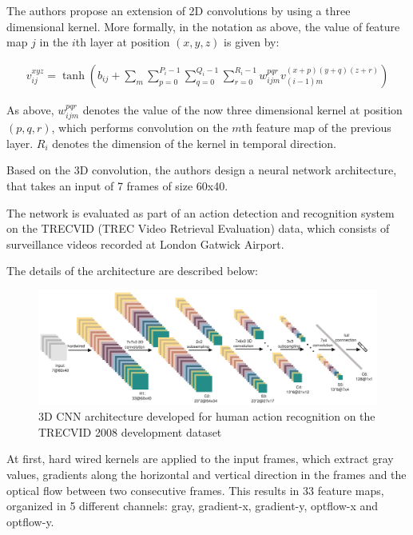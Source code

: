 The authors propose an extension of 2D convolutions by using a three dimensional kernel. More formally, in the notation as above, the value of feature map $j$ in the $i$th layer at position $(x,y,z)$ is given by:

\begin{align*}
    v_{ij}^{xyz} = \tanh \left( b_{ij} + \sum_m \sum_{p=0}^{P_i -1} \sum_{q = 0}^{Q_i - 1} \sum_{r = 0}^{R_i - 1} w_{ijm}^{pqr} v_{(i-1)m}^{(x+p)(y+q)(z+r)} \right)
\end{align*}

As above, $w_{ijm}^{pqr}$ denotes the value of the now three dimensional kernel at position $(p,q,r)$, which performs convolution on the $m$th feature map of the previous layer.
$R_i$ denotes the dimension of the kernel in temporal direction. 

Based on the 3D convolution, the authors design a neural network architecture, that takes an input of 7 frames of size 60x40.

The network is evaluated as part of an action detection and recognition system on the TRECVID (TREC Video Retrieval Evaluation) data, which consists of surveillance videos recorded at London Gatwick Airport.

The details of the architecture are described below:

\begin{figure}[H]
    \centering
    \includegraphics[width=\textwidth]{img_deep/3dconv_architecture}
    \caption{3D CNN architecture developed for human action recognition on the TRECVID 2008 development dataset \cite{ji_3d_2013}}
    \label{fig:3dconv_architecture}
\end{figure}

At first, hard wired kernels are applied to the input frames, which extract gray values, gradients along the horizontal and vertical direction in the frames and the optical flow between two consecutive frames. This results in 33 feature maps, organized in 5 different channels: gray, gradient-x, gradient-y, optflow-x and optflow-y.

